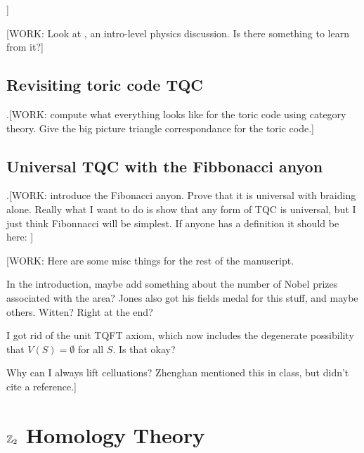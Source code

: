\documentclass{article}
\theoremstyle{definition}
\numberwithin{figure}{section}
\begin{document}
]

[WORK: Look at \cite{lahtinen2017short}, an intro-level physics discussion. Is there something to learn from it?]



\subsection{Revisiting toric code TQC}
\label{Revisiting toric code TQC}

.[WORK: compute what everything looks like for the toric code using category theory. Give the big picture triangle correspondance for the toric code.]


\subsection{Universal TQC with the Fibbonacci anyon}
\label{Universal TQC with the Fibbonacci anyon}

.[WORK: introduce the Fibonacci anyon. Prove that it is universal with braiding alone. Really what I want to do is show that any form of TQC is universal, but I just think Fibonnacci will be simplest. If anyone has a definition it should be here: \cite{trebst2008short}]




[WORK: Here are some misc things for the rest of the manuscript.

In the introduction, maybe add something about the number of Nobel prizes associated with the area? Jones also got his fields medal for this stuff, and maybe others. Witten? Right at the end?

I got rid of the unit TQFT axiom, which now includes the degenerate possibility that $V(S)=\emptyset$ for all $S$. Is that okay?

Why can I always lift celluations? Zhenghan mentioned this in class, but didn't cite a reference.]
\appendix

\section{$\mathbb{Z}_2$ Homology Theory}
\label{Homology}
\end{document}

